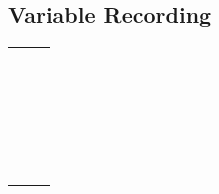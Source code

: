 \newpage
\subsection{Variable Recording}
\renewcommand{\arraystretch}{2}
\begin{tabular}{ | m{15em} | m{15em}| m{15em} |} 
    \hline
        &  & \\
    \hline
        & &  \\
    \hline
        & &  \\
    \hline
        & &   \\
    \hline
        & &   \\
    \hline
        &  &  \\
    \hline
         & & \\
    \hline
        & & \\
    \hline
        & &\\
    \hline
        &  & \\
    \hline
         & &\\
    \hline
         &  & \\
    \hline
          &  & \\
    \hline
         &  & \\
    \hline
        & &  \\
    \hline
       &  & \\
    \hline
       &  & \\
    \hline
       &   & \\
    \hline
       & &  \\
    \hline
       & &  \\
    \hline
       & &  \\
    \hline
       & &  \\
    \hline
       &  & \\
    \hline
       &  & \\
    \hline
       &  & \\
    \hline
       & &  \\
    \hline
       &  & \\
    \hline

\end{tabular}


